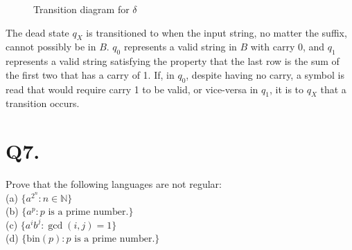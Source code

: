 \documentclass[]{article}
\begin{document}
\begin{figure}[]
		\caption{Transition diagram for $\delta$}
	\end{figure}
	The dead state $q_X$ is transitioned to when the input string, no matter the suffix, cannot possibly be in $B$. $q_0$ represents a valid string in $B$ with carry 0, and $q_1$ represents a valid string satisfying the property that the last row is the sum of the first two that has a carry of 1. If, in $q_0$, despite having no carry, a symbol is read that would require carry 1 to be valid, or vice-versa in $q_1$, it is to $q_X$ that a transition occurs.
	
	\pagebreak
	
	\section*{Q7.}
	Prove that the following languages are not regular: \\
	(a) $\{a^{2^n} : n \in \mathbb{N}\}$ \\
	(b) $\{a^p : p \text{ is a prime number.}\}$ \\
	(c) $\{a^i b^j : \gcd{(i, j)} = 1\}$ \\
	(d) $\{\text{bin}(p) : p \text{ is a prime number.}\}$ \\
	
\end{document}

